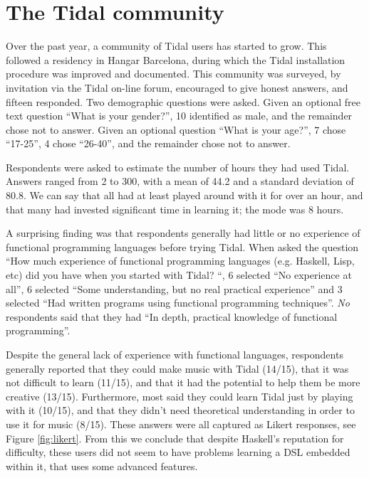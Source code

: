 \documentclass[authoryear]{sigplanconf}
\begin{document}
\section{The Tidal community}


Over the past year, a community of Tidal users has started to
grow. This followed a residency in Hangar Barcelona, during which the
Tidal installation procedure was improved and documented. This
community was surveyed, by invitation via the Tidal on-line forum,
encouraged to give honest answers, and fifteen responded. Two
demographic questions were asked. Given an optional free text question
``What is your gender?'', 10 identified as male, and the remainder
chose not to answer. Given an optional question ``What is your age?'',
7 chose ``17-25'', 4 chose ``26-40'', and the remainder chose not to
answer.

Respondents were asked to estimate the number of hours they had used
Tidal. Answers ranged from 2 to 300, with a mean of 44.2 and a
standard deviation of 80.8. We can say that all had at least played
around with it for over an hour, and that many had invested
significant time in learning it; the mode was 8 hours.

A surprising finding was that respondents generally had little or no
experience of functional programming languages before trying
Tidal. When asked the question ``How much experience of functional
programming languages (e.g. Haskell, Lisp, etc) did you have when you
started with Tidal?  ``, 6 selected ``No experience at all'', 6
selected ``Some understanding, but no real practical experience'' and
3 selected ``Had written programs using functional programming
techniques''. \emph{No} respondents said that they had ``In depth,
practical knowledge of functional programming''.

Despite the general lack of experience with functional languages,
respondents generally reported that they could make music with Tidal
(14/15), that it was not difficult to learn (11/15), and that it had
the potential to help them be more creative (13/15). Furthermore, most
said they could learn Tidal just by playing with it (10/15), and that
they didn't need theoretical understanding in order to use it for
music (8/15). These answers were all captured as Likert responses, see
Figure \ref{fig:likert}. From this we conclude that despite Haskell's
reputation for difficulty, these users did not seem to have problems
learning a DSL embedded within it, that uses some advanced features.
\end{document}
